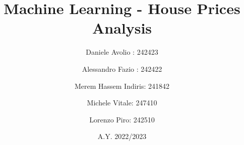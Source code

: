 \documentclass[12]{report}
\begin{document}
\title{Machine Learning - House Prices Analysis}
\author{Daniele Avolio : 242423\\
    \and
    Alessandro Fazio : 242422\\
    \and
    Merem Hassem Indiris: 241842\\
    \and
    Michele Vitale: 247410\\
    \and
    Lorenzo Piro: 242510\\}
\date{A.Y. 2022/2023}
\maketitle


\begin{titlepage}
    \noindent{}
\end{titlepage}

\tableofcontents



\newpage








\end{document}
